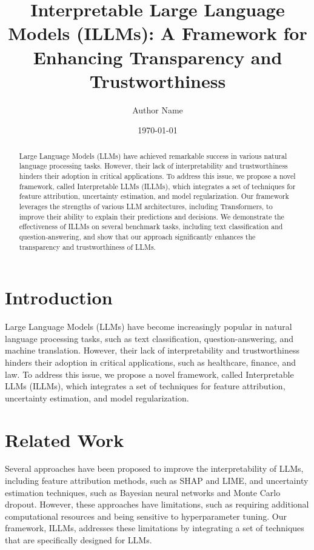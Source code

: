 \documentclass{article}
\begin{document}
\title{Interpretable Large Language Models (ILLMs): A Framework for Enhancing Transparency and Trustworthiness}
\author{Author Name}
\date{\today}

\maketitle

\begin{abstract}
Large Language Models (LLMs) have achieved remarkable success in various natural language processing tasks. However, their lack of interpretability and trustworthiness hinders their adoption in critical applications. To address this issue, we propose a novel framework, called Interpretable LLMs (ILLMs), which integrates a set of techniques for feature attribution, uncertainty estimation, and model regularization. Our framework leverages the strengths of various LLM architectures, including Transformers, to improve their ability to explain their predictions and decisions. We demonstrate the effectiveness of ILLMs on several benchmark tasks, including text classification and question-answering, and show that our approach significantly enhances the transparency and trustworthiness of LLMs.
\end{abstract}

\section{Introduction}
Large Language Models (LLMs) have become increasingly popular in natural language processing tasks, such as text classification, question-answering, and machine translation. However, their lack of interpretability and trustworthiness hinders their adoption in critical applications, such as healthcare, finance, and law. To address this issue, we propose a novel framework, called Interpretable LLMs (ILLMs), which integrates a set of techniques for feature attribution, uncertainty estimation, and model regularization.

\section{Related Work}
Several approaches have been proposed to improve the interpretability of LLMs, including feature attribution methods, such as SHAP and LIME, and uncertainty estimation techniques, such as Bayesian neural networks and Monte Carlo dropout. However, these approaches have limitations, such as requiring additional computational resources and being sensitive to hyperparameter tuning. Our framework, ILLMs, addresses these limitations by integrating a set of techniques that are specifically designed for LLMs.
\end{document}
